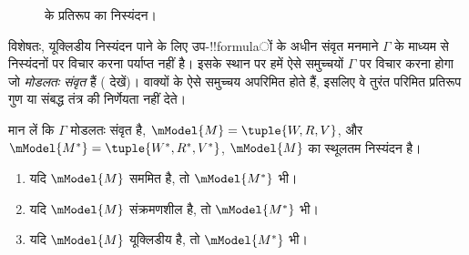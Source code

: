 \documentclass[../../../include/open-logic-section]{subfiles}
\begin{document}
\begin{figure}[ht]
  \centering
  \caption{ के प्रतिरूप का निस्यंदन।}
\end{figure}

विशेषतः, यूक्लिडीय निस्यंदन पाने के लिए उप-!!{formula}ों के अधीन संवृत
मनमाने $\Gamma$ के माध्यम से निस्यंदनों पर विचार करना पर्याप्त नहीं है।
इसके स्थान पर हमें ऐसे समुच्चयों $\Gamma$ पर विचार करना होगा जो
\emph{मोडलतः संवृत} हैं ( देखें)। वाक्यों
के ऐसे समुच्चय अपरिमित होते हैं, इसलिए वे तुरंत परिमित प्रतिरूप गुण या
संबद्ध तंत्र की निर्णेयता नहीं देते।

\begin{thm}
  मान लें कि $\Gamma$ मोडलतः संवृत है, $\mModel{M}=\tuple{W,R,V}$, और
  $\mModel{M^*} = \tuple{W^*,R^*,V^*}$, $\mModel{M}$ का स्थूलतम
  निस्यंदन है।
  \begin{enumerate}
  \item यदि $\mModel{M}$ सममित है, तो $\mModel{M^*}$ भी।
  \item यदि $\mModel{M}$ संक्रमणशील है, तो $\mModel{M^*}$ भी।
  \item यदि $\mModel{M}$ यूक्लिडीय है, तो $\mModel{M^*}$ भी।
  \end{enumerate}
\end{thm}
\end{document}
